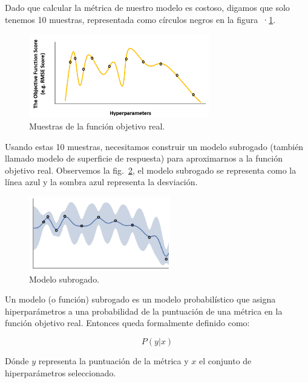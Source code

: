 \documentclass[a4paper,12pt]{article}
\begin{document}
Dado que calcular la métrica de nuestro modelo es costoso, digamos que solo tenemos 10 muestras, representada como círculos negros en la figura~·\ref{fig:bayes7}.

\begin{figure}[H]
	\begin{center}
	\includegraphics[width=0.7\textwidth]{bayes_opt_7.png}
  	\caption{Muestras de la función objetivo real.}
  	\label{fig:bayes7}
  	\end{center}
\end{figure}

Usando estas 10 muestras, necesitamos construir un modelo subrogado (también llamado modelo de superficie de respuesta) para aproximarnos a la función objetivo real. Observemos la fig.~\ref{fig:bayes8}, el modelo subrogado se representa como la línea azul y la sombra azul representa la desviación.

\begin{figure}[H]
	\begin{center}
	\includegraphics[width=0.55\textwidth]{bayes_opt_8.png}
  	\caption{Modelo subrogado.}
  	\label{fig:bayes8}
  	\end{center}
\end{figure}

Un modelo (o función) subrogado es un modelo probabilístico que asigna hiperparámetros a una probabilidad de la puntuación de una métrica en la función objetivo real. Entonces queda formalmente definido como:

$$ P(y|x) $$

Dónde $y$ representa la puntuación de la métrica y $x$ el conjunto de hiperparámetros seleccionado.
\end{document}
